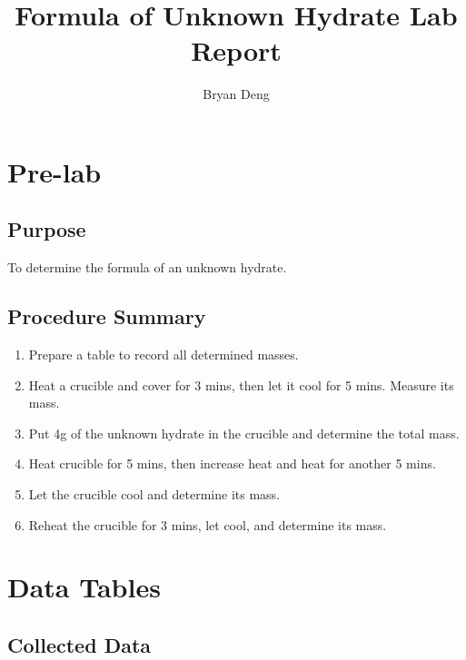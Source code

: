 \documentclass{article}
\title{Formula of Unknown Hydrate Lab Report}
\author{Bryan Deng}
\begin{document}
\maketitle
\newpage
\tableofcontents
\newpage

\section{Pre-lab}

\subsection{Purpose}

To determine the formula of an unknown hydrate.

\subsection{Procedure Summary}

\begin{enumerate}
    \item Prepare a table to record all determined masses.
    \item Heat a crucible and cover for 3 mins, then let it cool for 5 mins. Measure its mass.
    \item Put 4g of the unknown hydrate in the crucible and determine the total mass.
    \item Heat crucible for 5 mins, then increase heat and heat for another 5 mins.
    \item Let the crucible cool and determine its mass.
    \item Reheat the crucible for 3 mins, let cool, and determine its mass.
\end{enumerate}

\section{Data Tables}

\subsection{Collected Data}
\end{document}

